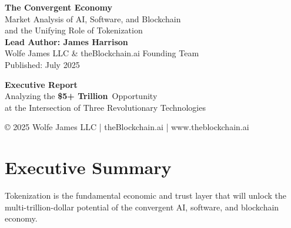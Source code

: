 \documentclass[11pt,a4paper]{report}
\newcommand{\marketvalue}[2]{\textcolor{trust}{\textbf{\$#1}}\,\textcolor{darkgray}{#2}}
\begin{document}
\begin{titlepage}
    \begin{center}
        {\Huge\bfseries\color{ocean} The Convergent Economy}\\[0.5cm]
        {\Large\color{sky} Market Analysis of \textcolor{ocean}{AI}, \textcolor{sky}{Software}, and \textcolor{sun}{Blockchain}}\\[0.3cm]
        {\Large\color{trust} and the Unifying Role of \textcolor{sun}{Tokenization}}\\[2cm]
        
        {\large\bfseries\color{ocean} 
         Lead Author: James Harrison}\\[0.2cm]
        {\color{darkgray} 
         Wolfe James LLC \& theBlockchain.ai Founding Team}\\[0.5cm]
        {\color{darkgray} Published: July 2025}\\[1cm]
        
        \begin{tcolorbox}[
            width=0.8\textwidth,
            colback=sky!5,
            colframe=ocean,
            boxrule=3pt,
            arc=0pt,
            outer arc=0pt
        ]            \centering\large
            \textbf{Executive Report}\\[0.5cm]
            Analyzing the \marketvalue{5+ Trillion}{} Opportunity\\
            at the Intersection of Three Revolutionary Technologies
        \end{tcolorbox}
        
        \vfill
        
        {\small\color{darkgray} 
         © 2025 Wolfe James LLC | theBlockchain.ai | www.theblockchain.ai
        }
    \end{center}
\end{titlepage}

\tableofcontents

\chapter*{Executive Summary}

\begin{keypoint}
Tokenization is the fundamental economic and trust layer that will unlock the multi-trillion-dollar potential of the convergent AI, software, and blockchain economy.
\end{keypoint}
\end{document}

